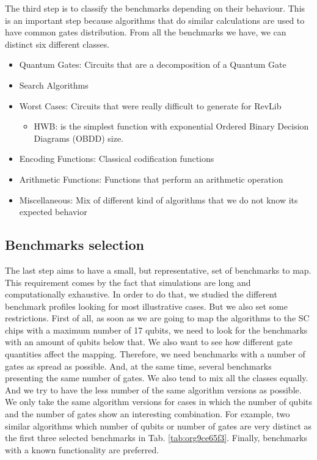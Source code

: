 The third step is to classify the benchmarks depending on their behaviour.
This is an important step because algorithms that do similar calculations are used to have common gates distribution.
From all the benchmarks we have, we can distinct six different classes.

\begin{itemize}
\item Quantum Gates: Circuits that are a decomposition of a Quantum Gate
\item Search Algorithms
\item Worst Cases: Circuits that were really difficult to generate for RevLib
\begin{itemize}
\item HWB: is the simplest function with exponential Ordered Binary Decision Diagrams (OBDD) size.
\end{itemize}
\item Encoding Functions: Classical codification functions
\item Arithmetic Functions: Functions that perform an arithmetic operation
\item Miscellaneous: Mix of different kind of algorithms that we do not know its expected behavior
\end{itemize}


\subsection*{Benchmarks selection}
\label{sec:orgc94a059}

The last step aims to have a small, but representative, set of benchmarks to map.
This requirement comes by the fact that simulations are long and computationally exhaustive.
In order to do that, we studied the different benchmark profiles looking for most illustrative cases.
But we also set some restrictions.
First of all, as soon as we are going to map the algorithms to the SC chips with a maximum number of 17 qubits, we need to look for the benchmarks with an amount of qubits below that.
We also want to see how different gate quantities affect the mapping.
Therefore, we need benchmarks with a number of gates as spread as possible.
And, at the same time, several benchmarks presenting the same number of gates.
We also tend to mix all the classes equally.
And we try to have the less number of the same algorithm versions as possible.
We only take the same algorithm versions for cases in which the number of qubits and the number of gates show an interesting combination.
For example, two similar algorithms which number of qubits or number of gates are very distinct as the first three selected benchmarks in Tab. \ref{tab:org9ce65f3}.
Finally, benchmarks with a known functionality are preferred.

